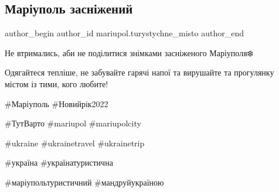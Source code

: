  
 
 
 
 

\subsection{Маріуполь засніжений}
\label{sec:27_12_2021.fb.mariupol.turystychne_misto.1.mariupol_zasnizhenyj}

\ifcmt
 author_begin
   author_id mariupol.turystychne_misto
 author_end
\fi

Не втримались, аби не поділитися знімками засніженого Маріуполя❄️

Одягайтеся тепліше, не забувайте гарячі напої та вирушайте та прогулянку містом із тими, кого любите!

\#Маріуполь \#Новийрік2022 

\#ТутВарто \#mariupol \#mariupolcity 

\#ukraine \#ukrainetravel \#ukrainetrip 

\#україна \#українатуристична 

\#маріупольтуристичний \#мандруйукраїною
